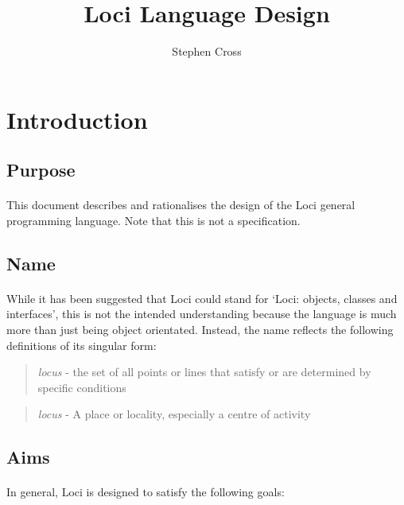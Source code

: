 \documentclass{article}
\title{Loci Language Design}
\author{Stephen Cross}
\date{}
\begin{document}
\maketitle

\section{Introduction}

\subsection{Purpose}

\paragraph{}
This document describes and rationalises the design of the Loci general programming language. Note that this is not a specification.

\subsection{Name}

\paragraph{}
While it has been suggested that Loci could stand for `Loci: objects, classes and interfaces', this is not the intended understanding because the language is much more than just being object orientated. Instead, the name reflects the following definitions of its singular form:

\begin{quotation}
\emph{locus} - the set of all points or lines that satisfy or are determined by specific conditions
\end{quotation}
\begin{quotation}
\emph{locus} - A place or locality, especially a centre of activity
\end{quotation}

\subsection{Aims}

\paragraph{}
In general, Loci is designed to satisfy the following goals:
\end{document}

